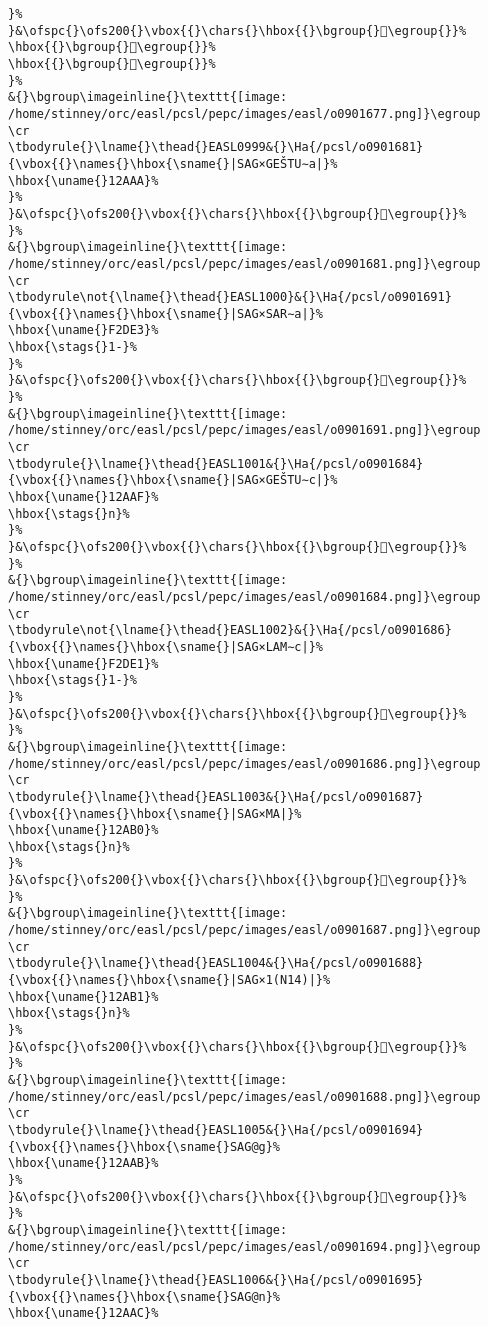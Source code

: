 \begin{verbatim}
}%
}&\ofspc{}\ofs200{}\vbox{{}\chars{}\hbox{{}\bgroup{}𒪩\egroup{}}%
\hbox{{}\bgroup{}𒪮\egroup{}}%
\hbox{{}\bgroup{}𒪲\egroup{}}%
}%
&{}\bgroup\imageinline{}\texttt{[image: /home/stinney/orc/easl/pcsl/pepc/images/easl/o0901677.png]}\egroup
\cr
\tbodyrule{}\lname{}\thead{}EASL0999&{}\Ha{/pcsl/o0901681}{\vbox{{}\names{}\hbox{\sname{}|SAG×GEŠTU∼a|}%
\hbox{\uname{}12AAA}%
}%
}&\ofspc{}\ofs200{}\vbox{{}\chars{}\hbox{{}\bgroup{}𒪪\egroup{}}%
}%
&{}\bgroup\imageinline{}\texttt{[image: /home/stinney/orc/easl/pcsl/pepc/images/easl/o0901681.png]}\egroup
\cr
\tbodyrule\not{\lname{}\thead{}EASL1000}&{}\Ha{/pcsl/o0901691}{\vbox{{}\names{}\hbox{\sname{}|SAG×SAR∼a|}%
\hbox{\uname{}F2DE3}%
\hbox{\stags{}1-}%
}%
}&\ofspc{}\ofs200{}\vbox{{}\chars{}\hbox{{}\bgroup{}󲷣\egroup{}}%
}%
&{}\bgroup\imageinline{}\texttt{[image: /home/stinney/orc/easl/pcsl/pepc/images/easl/o0901691.png]}\egroup
\cr
\tbodyrule{}\lname{}\thead{}EASL1001&{}\Ha{/pcsl/o0901684}{\vbox{{}\names{}\hbox{\sname{}|SAG×GEŠTU∼c|}%
\hbox{\uname{}12AAF}%
\hbox{\stags{}n}%
}%
}&\ofspc{}\ofs200{}\vbox{{}\chars{}\hbox{{}\bgroup{}𒪯\egroup{}}%
}%
&{}\bgroup\imageinline{}\texttt{[image: /home/stinney/orc/easl/pcsl/pepc/images/easl/o0901684.png]}\egroup
\cr
\tbodyrule\not{\lname{}\thead{}EASL1002}&{}\Ha{/pcsl/o0901686}{\vbox{{}\names{}\hbox{\sname{}|SAG×LAM∼c|}%
\hbox{\uname{}F2DE1}%
\hbox{\stags{}1-}%
}%
}&\ofspc{}\ofs200{}\vbox{{}\chars{}\hbox{{}\bgroup{}󲷡\egroup{}}%
}%
&{}\bgroup\imageinline{}\texttt{[image: /home/stinney/orc/easl/pcsl/pepc/images/easl/o0901686.png]}\egroup
\cr
\tbodyrule{}\lname{}\thead{}EASL1003&{}\Ha{/pcsl/o0901687}{\vbox{{}\names{}\hbox{\sname{}|SAG×MA|}%
\hbox{\uname{}12AB0}%
\hbox{\stags{}n}%
}%
}&\ofspc{}\ofs200{}\vbox{{}\chars{}\hbox{{}\bgroup{}𒪰\egroup{}}%
}%
&{}\bgroup\imageinline{}\texttt{[image: /home/stinney/orc/easl/pcsl/pepc/images/easl/o0901687.png]}\egroup
\cr
\tbodyrule{}\lname{}\thead{}EASL1004&{}\Ha{/pcsl/o0901688}{\vbox{{}\names{}\hbox{\sname{}|SAG×1(N14)|}%
\hbox{\uname{}12AB1}%
\hbox{\stags{}n}%
}%
}&\ofspc{}\ofs200{}\vbox{{}\chars{}\hbox{{}\bgroup{}𒪱\egroup{}}%
}%
&{}\bgroup\imageinline{}\texttt{[image: /home/stinney/orc/easl/pcsl/pepc/images/easl/o0901688.png]}\egroup
\cr
\tbodyrule{}\lname{}\thead{}EASL1005&{}\Ha{/pcsl/o0901694}{\vbox{{}\names{}\hbox{\sname{}SAG@g}%
\hbox{\uname{}12AAB}%
}%
}&\ofspc{}\ofs200{}\vbox{{}\chars{}\hbox{{}\bgroup{}𒪫\egroup{}}%
}%
&{}\bgroup\imageinline{}\texttt{[image: /home/stinney/orc/easl/pcsl/pepc/images/easl/o0901694.png]}\egroup
\cr
\tbodyrule{}\lname{}\thead{}EASL1006&{}\Ha{/pcsl/o0901695}{\vbox{{}\names{}\hbox{\sname{}SAG@n}%
\hbox{\uname{}12AAC}%

\end{verbatim}
